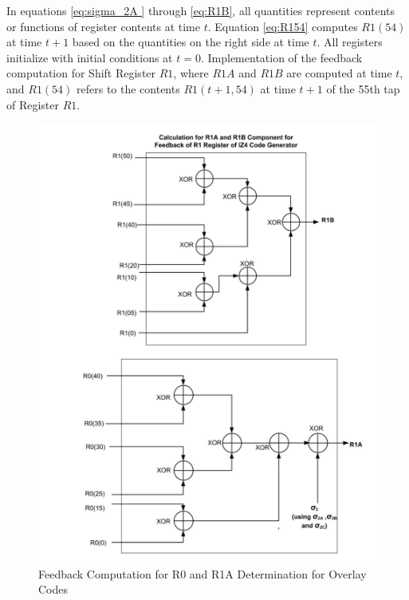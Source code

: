 In equations \ref{eq:sigma_2A } through \ref{eq:R1B}, all quantities represent contents or functions of register contents at time \(t\). Equation \ref{eq:R154} computes \(R1(54)\) at time \(t+1\) based on the quantities on the right side at time \(t\). All registers initialize with initial conditions at \(t=0\).
Implementation of the feedback computation for Shift Register \(R1\), where \(R1A\) and \(R1B\) are computed at time \(t\), and \(R1(54)\) refers to the contents \(R1(t+1,54)\) at time \(t+1\) of the 55th tap of Register \(R1\).

\begin{figure}[h]
    \centering
    \includegraphics[width=\columnwidth]{figs/fig8.png}
    \captionsetup{justification=centering}
    \caption{Feedback Computation for R0 and R1A Determination for Overlay Codes}
    \label{fig:R0overlay}
\end{figure}

